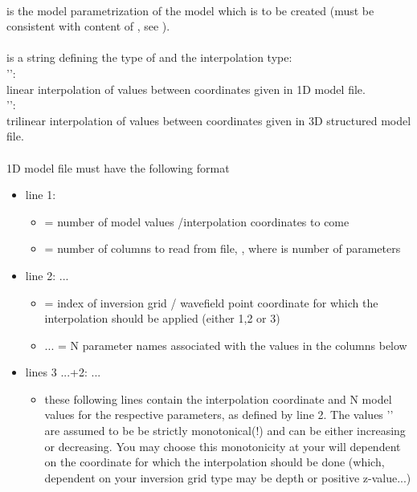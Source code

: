 \paragraph{}
 is the model parametrization of the model which is to be created (must be consistent with content of , see ).
\paragraph{}
 is a string defining the type of  and the interpolation type:\\
'':\\
linear interpolation of values between coordinates given in 1D model file.\\
'':\\
trilinear interpolation of values between coordinates given in 3D structured model file.\\
\\
1D model file must have the following format
\begin{itemize}
\item[]line 1:     
\begin{itemize}
\item[] = number of model values /interpolation coordinates to come
\item[] = number of columns to read from file, , where  is number of parameters
\end{itemize}
\item[]line 2:      ... 
\begin{itemize}
\item[] = index of inversion grid / wavefield point coordinate for which the interpolation should be applied (either 1,2 or 3)
\item[] ...  = N parameter names associated with the values in the columns below
\end{itemize}
\item[]lines 3 ...+2:    ... 
\begin{itemize}
\item[]these following  lines contain the interpolation coordinate and N model values for the respective parameters, as defined by line 2. The values '' are assumed to be be strictly monotonical(!) and can be either increasing or decreasing. You may choose this monotonicity at your will dependent on the coordinate for which the interpolation should be done (which, dependent on your inversion grid type may be depth or positive z-value...)
\end{itemize}
\end{itemize}
